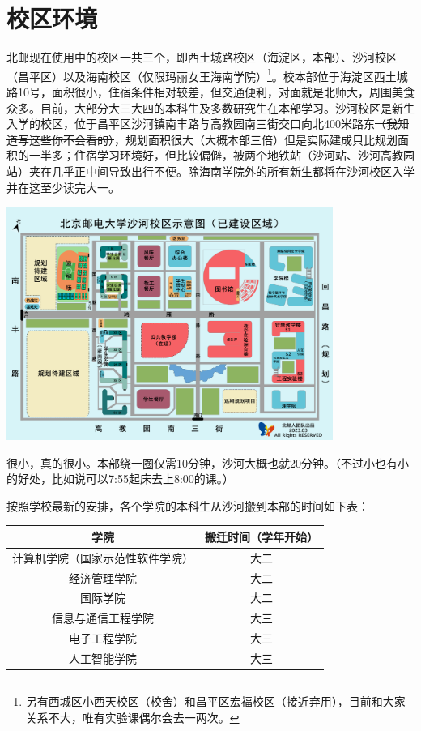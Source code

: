 \section{校区环境}

北邮现在使用中的校区一共三个，即西土城路校区（海淀区，本部）、沙河校区（昌平区）以及海南校区（仅限玛丽女王海南学院）\footnote{另有西城区小西天校区（校舍）和昌平区宏福校区（接近弃用），目前和大家关系不大，唯有实验课偶尔会去一两次。}。校本部位于海淀区西土城路10号，面积很小，住宿条件相对较差，但交通便利，对面就是北师大，周围美食众多。目前，大部分大三大四的本科生及多数研究生在本部学习。沙河校区是新生入学的校区，位于昌平区沙河镇南丰路{\small{}与高教园南三街交口向北400米路东\sout{（我知道写这些你不会看的）}}，规划面积很大（大概本部三倍）但是实际建成只比规划面积的一半多；住宿学习环境好，但比较偏僻，被两个地铁站（沙河站、沙河高教园站）夹在几乎正中间导致出行不便。除海南学院外的所有新生都将在沙河校区入学并在这至少读完大一。

\begin{center}
    \includegraphics[width=0.80\textwidth]{images/shahe-map.jpg}
\end{center}


很小，真的很小。本部绕一圈仅需10分钟，沙河大概也就20分钟。{\small （不过小也有小的好处，比如说可以7:55起床去上8:00的课。）}


按照学校最新的安排，各个学院的本科生从沙河搬到本部的时间如下表：

\begin{center}
    \begin{tabular}{cc}
        \toprule
        学院 & 搬迁时间（学年开始） \\
        \midrule
        计算机学院（国家示范性软件学院） & 大二 \\
        经济管理学院 & 大二 \\
        国际学院 & 大二\\
        信息与通信工程学院 & 大三 \\
        电子工程学院 & 大三 \\
        人工智能学院 & 大三 \\
        \bottomrule
    \end{tabular}
\end{center}

